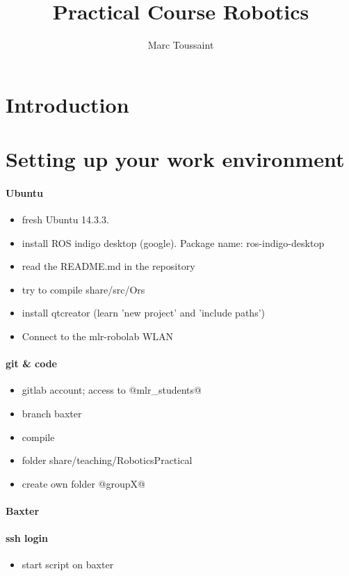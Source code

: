 \documentclass[10pt,fleqn,twoside]{article}
\title{Practical Course Robotics}
\author{Marc Toussaint}
\begin{document}
\maketitle

{\small\tableofcontents }

\section{Introduction}

\section{Setting up your work environment}

\paragraph{Ubuntu}
\begin{itemize}
\item fresh Ubuntu 14.3.3.
\item install ROS indigo desktop (google). Package name:
  ros-indigo-desktop
\item read the README.md in the repository
\item try to compile share/src/Ors
\item install qtcreator (learn 'new project' and 'include paths')
\item Connect to the mlr-robolab WLAN
\end{itemize}

\paragraph{git \& code}
\begin{itemize}
\item gitlab account; access to @mlr_students@
\item branch baxter
\item compile
\item folder share/teaching/RoboticsPractical
\item create own folder @groupX@
\end{itemize}

\paragraph{Baxter}

\paragraph{ssh login}
\begin{itemize}
\item start script on baxter
\end{itemize}
\end{document}

